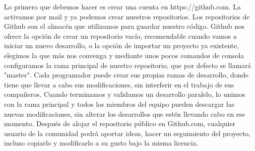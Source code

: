 Lo primero que debemos hacer es crear una cuenta en https://github.com. La activamos por mail y ya podemos crear nuestros repositorios. Los repositorios de Github son el almacén que utilizamos para guardar nuestro código. Github nos ofrece la opción de crear un repositorio vacío, recomendable cuando vamos a iniciar un nuevo desarrollo, o la opción de importar un proyecto ya existente, elegimos la que más nos convenga y mediante unos pocos comandos de consola configuramos la rama principal de nuestro repositorio, que por defecto se llamará "master". Cada programador puede crear sus propias ramas de desarrollo, donde tiene que llevar a cabo sus modificaciones, sin interferir en el trabajo de sus compañeros. Cuando terminamos y validamos un desarrollo paralelo, lo unimos con la rama principal y todos los miembros del equipo pueden descargar las nuevas modificaciones, sin alterar los desarrollos que estén llevando cabo en ese momento. Después de alojar el repositorio público en Github.com, cualquier usuario de la comunidad podrá aportar ideas, hacer un seguimiento del proyecto, incluso copiarlo y modificarlo a su gusto bajo la misma licencia.

